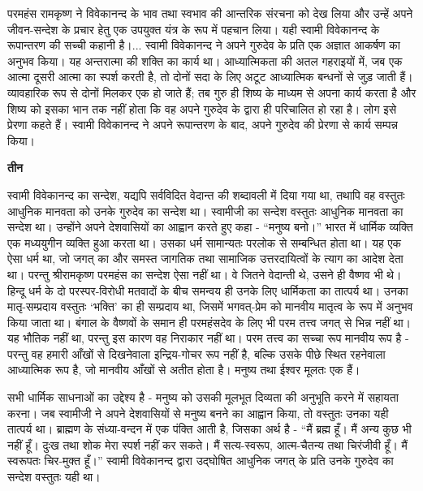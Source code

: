 परमहंस रामकृष्ण ने विवेकानन्द के भाव तथा स्वभाव की आन्तरिक संरचना को देख लिया और उन्हें अपने जीवन-सन्देश के प्रचार हेतु एक उपयुक्त यंत्र के रूप में पहचान लिया। यही स्वामी विवेकानन्द के रूपान्तरण की सच्ची कहानी है।... स्वामी विवेकानन्द ने अपने गुरुदेव के प्रति एक अज्ञात आकर्षण का अनुभव किया। यह अन्तरात्मा की शक्ति का कार्य था। आध्यात्मिकता की अतल गहराइयों में, जब एक आत्मा दूसरी आत्मा का स्पर्श करती है, तो दोनों सदा के लिए अटूट आध्यात्मिक बन्धनों से जुड़ जाती हैं। व्यावहारिक रूप से दोनों मिलकर एक हो जाते हैं; तब गुरु ही शिष्य के माध्यम से अपना कार्य करता है और शिष्य को इसका भान तक नहीं होता कि वह अपने गुरुदेव के द्वारा ही परिचालित हो रहा है। लोग इसे प्रेरणा कहते हैं। स्वामी विवेकानन्द ने अपने रूपान्तरण के बाद, अपने गुरुदेव की प्रेरणा से कार्य सम्पन्न किया। 

\centerline{\textbf{तीन}}

स्वामी विवेकानन्द का सन्देश, यद्यपि सर्वविदित वेदान्त की शब्दावली में दिया गया था, तथापि वह वस्तुतः आधुनिक मानवता को उनके गुरुदेव का सन्देश था। स्वामीजी का सन्देश वस्तुतः आधुनिक मानवता का सन्देश था। उन्होंने अपने देशवासियों का आह्वान करते हुए कहा - “मनुष्य बनो।” भारत में धार्मिक व्यक्ति एक मध्ययुगीन व्यक्ति हुआ करता था। उसका धर्म सामान्यतः परलोक से सम्बन्धित होता था। यह एक ऐसा धर्म था, जो जगत् का और समस्त जागतिक तथा सामाजिक उत्तरदायित्वों के त्याग का आदेश देता था। परन्तु श्रीरामकृष्ण परमहंस का सन्देश ऐसा नहीं था। वे जितने वेदान्ती थे, उसने ही वैष्णव भी थे। हिन्दू धर्म के दो परस्पर-विरोधी मतवादों के बीच समन्वय ही उनके लिए धार्मिकता का तात्पर्य था। उनका मातृ-सम्प्रदाय वस्तुतः ‘भक्ति’ का ही सम्प्रदाय था, जिसमें भगवत्-प्रेम को मानवीय मातृत्व के रूप में अनुभव किया जाता था। बंगाल के वैष्णवों के समान ही परमहंसदेव के लिए भी परम तत्त्व जगत् से भिन्न नहीं था। यह भौतिक नहीं था, परन्तु इस कारण वह निराकार नहीं था। परम तत्त्व का सच्चा रूप मानवीय रूप है - परन्तु वह हमारी आँखों से दिखनेवाला इन्द्रिय-गोचर रूप नहीं है, बल्कि उसके पीछे स्थित रहनेवाला आध्यात्मिक रूप है, जो मानवीय आँखों से अतीत होता है। मनुष्य तथा ईश्वर मूलतः एक हैं। 

सभी धार्मिक साधनाओं का उद्देश्य है - मनुष्य को उसकी मूलभूत दिव्यता की अनुभूति करने में सहायता करना। जब स्वामीजी ने अपने देशवासियों से मनुष्य बनने का आह्वान किया, तो वस्तुतः उनका यही तात्पर्य था। ब्राह्मण के संध्या-वन्दन में एक पंक्ति आती है, जिसका अर्थ है - “मैं ब्रह्म हूँ। मैं अन्य कुछ भी नहीं हूँ। दुःख तथा शोक मेरा स्पर्श नहीं कर सकते। मैं सत्य-स्वरूप, आत्म-चैतन्य तथा चिरंजीवी हूँ। मैं स्वरूपतः चिर-मुक्त हूँ।” स्वामी विवेकानन्द द्वारा उद्घोषित आधुनिक जगत् के प्रति उनके गुरुदेव का सन्देश वस्तुतः यही था। 

